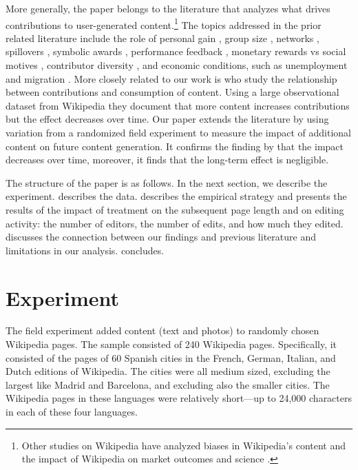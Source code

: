 \documentclass[12pt]{article}
\begin{document}
More generally, the paper belongs to the literature that analyzes what drives contributions to user-generated content.\footnote{Other studies on Wikipedia have analyzed biases in Wikipedia's content \citep{greenstein_is_2012,greenstein_experts_2017,hinnosaar2018gender} and the impact of Wikipedia on market outcomes \citep{xu_impact_2013,hinnosaar2017wikipedia} and science \citep{thompson2018science}.
}
The topics addressed in the prior related literature include the role of personal gain \citep{shah_motivation_2006}, group size \citep{zhang_group_2011}, networks \citep{fershtman_direct_2011, ransbotham_network_2012}, spillovers \citep{kummer2014spillovers}, symbolic awards \citep{gallus_fostering_2017},  performance feedback \citep{huang_motivating_2018}, monetary rewards vs social motives \citep{sun_motivation_2017}, contributor diversity \citep{ren_impact_2015}, and economic conditions, such as unemployment \citep{kummer2015downturn} and migration \citep{slivko2018brain}.
More closely related to our work is \cite{kane_content_2016} who study the relationship between contributions and consumption of content. Using a large observational dataset from Wikipedia they document that more content increases contributions but the effect decreases over time. 
Our paper extends the literature by using variation from a randomized field experiment to measure the impact of additional content on future content generation. It confirms the finding by \cite{kane_content_2016} that the impact decreases over time, moreover, it finds that the long-term effect is negligible.  

The structure of the paper is as follows. In the next section, we describe the experiment.  describes the data.  describes the empirical strategy and presents the results of the impact of treatment on the subsequent page length and on editing activity: the number of editors, the number of edits, and how much they edited.  discusses the connection between our findings and previous literature and limitations in our analysis.  concludes.


\section{Experiment} \label{S:Experiment}

The field experiment added content (text and photos) to randomly chosen Wikipedia pages.
The sample consisted of 240 Wikipedia pages. Specifically, it consisted of the pages of 60 Spanish cities in the French, German, Italian, and Dutch editions of Wikipedia. The cities were all medium sized, excluding the largest like Madrid and Barcelona, and excluding also the smaller cities. The Wikipedia pages in these languages were relatively short---up to 24,000 characters in each of these four languages.
\end{document}
